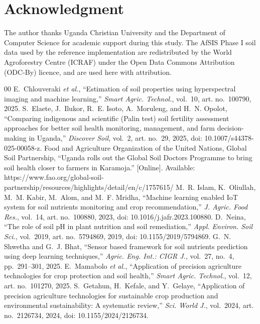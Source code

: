 \documentclass[conference]{IEEEtran}
\begin{document}
\section*{Acknowledgment}
The author thanks Uganda Christian University and the Department of Computer
Science for academic support during this study.
The AfSIS Phase I soil data used by the reference implementation are
redistributed by the World Agroforestry Centre (ICRAF) under the Open Data
Commons Attribution (ODC-By) licence, and are used here with attribution.

\begin{thebibliography}{00}
 E.~Chlouveraki \emph{et al.}, ``Estimation of soil properties using hyperspectral imaging and machine learning,'' \emph{Smart Agric. Technol.}, vol.~10, art. no.~100790, 2025.
 S.~Elaete, J.~Ilukor, R.~E. Isoto, A.~Moruleng, and H.~N. Opolot, ``Comparing indigenous and scientific (Palin test) soil fertility assessment approaches for better soil health monitoring, management, and farm decision-making in Uganda,'' \emph{Discover Soil}, vol.~2, art. no.~29, 2025, doi: 10.1007/s44378-025-00058-z.
 Food and Agriculture Organization of the United Nations, Global Soil Partnership, ``Uganda rolls out the Global Soil Doctors Programme to bring soil health closer to farmers in Karamoja.'' [Online]. Available: https://www.fao.org/global-soil-partnership/resources/highlights/detail/en/c/1757615/
 M.~R. Islam, K.~Oliullah, M.~M. Kabir, M.~Alom, and M.~F. Mridha, ``Machine learning enabled IoT system for soil nutrients monitoring and crop recommendation,'' \emph{J. Agric. Food Res.}, vol.~14, art. no.~100880, 2023, doi: 10.1016/j.jafr.2023.100880.
 D.~Neina, ``The role of soil pH in plant nutrition and soil remediation,'' \emph{Appl. Environ. Soil Sci.}, vol.~2019, art. no.~5794869, 2019, doi: 10.1155/2019/5794869.
 G.~N. Shwetha and G.~J. Bhat, ``Sensor based framework for soil nutrients prediction using deep learning techniques,'' \emph{Agric. Eng. Int.: CIGR J.}, vol.~27, no.~4, pp.~291--301, 2025.
 E.~Mamabolo \emph{et al.}, ``Application of precision agriculture technologies for crop protection and soil health,'' \emph{Smart Agric. Technol.}, vol.~12, art. no.~101270, 2025.
 S.~Getahun, H.~Kefale, and Y.~Gelaye, ``Application of precision agriculture technologies for sustainable crop production and environmental sustainability: A systematic review,'' \emph{Sci. World J.}, vol.~2024, art. no.~2126734, 2024, doi: 10.1155/2024/2126734.

\end{thebibliography}
\end{document}
